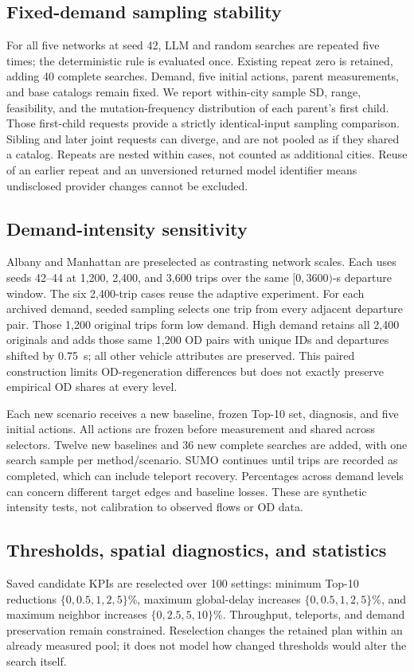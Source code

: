 \documentclass[11pt]{article}
\begin{document}
\subsection{Fixed-demand sampling stability}\label{sec:stability}
For all five networks at seed 42, LLM and random searches are repeated five times; the deterministic rule is evaluated once. Existing repeat zero is retained, adding 40 complete searches. Demand, five initial actions, parent measurements, and base catalogs remain fixed. We report within-city sample SD, range, feasibility, and the mutation-frequency distribution of each parent's first child. Those first-child requests provide a strictly identical-input sampling comparison. Sibling and later joint requests can diverge, and are not pooled as if they shared a catalog. Repeats are nested within cases, not counted as additional cities. Reuse of an earlier repeat and an unversioned returned model identifier means undisclosed provider changes cannot be excluded.

\subsection{Demand-intensity sensitivity}\label{sec:demand-sensitivity}
Albany and Manhattan are preselected as contrasting network scales. Each uses seeds 42--44 at 1,200, 2,400, and 3,600 trips over the same $[0,3600)$-s departure window. The six 2,400-trip cases reuse the adaptive experiment. For each archived demand, seeded sampling selects one trip from every adjacent departure pair. Those 1,200 original trips form low demand. High demand retains all 2,400 originals and adds those same 1,200 OD pairs with unique IDs and departures shifted by 0.75~s; all other vehicle attributes are preserved. This paired construction limits OD-regeneration differences but does not exactly preserve empirical OD shares at every level.

Each new scenario receives a new baseline, frozen Top-10 set, diagnosis, and five initial actions. All actions are frozen before measurement and shared across selectors. Twelve new baselines and 36 new complete searches are added, with one search sample per method/scenario. SUMO continues until trips are recorded as completed, which can include teleport recovery. Percentages across demand levels can concern different target edges and baseline losses. These are synthetic intensity tests, not calibration to observed flows or OD data.

\subsection{Thresholds, spatial diagnostics, and statistics}\label{sec:statistics}
Saved candidate KPIs are reselected over 100 settings: minimum Top-10 reductions $\{0,0.5,1,2,5\}$\%, maximum global-delay increases $\{0,0.5,1,2,5\}$\%, and maximum neighbor increases $\{0,2.5,5,10\}$\%. Throughput, teleports, and demand preservation remain constrained. Reselection changes the retained plan within an already measured pool; it does not model how changed thresholds would alter the search itself.
\end{document}

